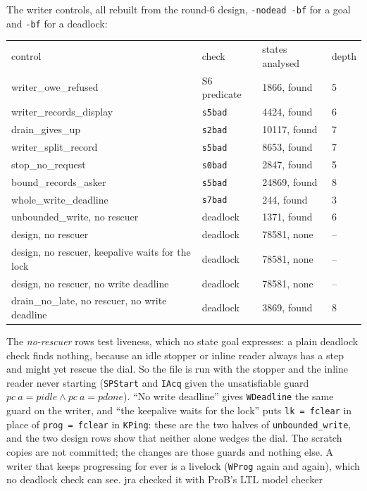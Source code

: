 \documentclass[a4paper,10pt,fleqn]{article}
\begin{document}
The writer controls, all rebuilt from the round-6 design, \texttt{-nodead -bf}
for a goal and \texttt{-bf} for a deadlock:
\begin{center}
\begin{tabular}{llll}
control & check & states analysed & depth \\
writer\_owe\_refused & S6 predicate & 1866, found & 5 \\
writer\_records\_display & \texttt{s5bad} & 4424, found & 6 \\
drain\_gives\_up & \texttt{s2bad} & 10117, found & 7 \\
writer\_split\_record & \texttt{s5bad} & 8653, found & 7 \\
stop\_no\_request & \texttt{s0bad} & 2847, found & 5 \\
bound\_records\_asker & \texttt{s5bad} & 24869, found & 8 \\
whole\_write\_deadline & \texttt{s7bad} & 244, found & 3 \\
unbounded\_write, no rescuer & deadlock & 1371, found & 6 \\
design, no rescuer & deadlock & 78581, none & -- \\
design, no rescuer, keepalive waits for the lock & deadlock & 78581, none & -- \\
design, no rescuer, no write deadline & deadlock & 78581, none & -- \\
drain\_no\_late, no rescuer, no write deadline & deadlock & 3869, found & 8 \\
\end{tabular}
\end{center}
The \emph{no-rescuer} rows test liveness, which no state goal expresses: a plain
deadlock check finds nothing, because an idle stopper or inline reader always has
a step and might yet rescue the dial.  So the file is run with the stopper and
the inline reader never starting (\texttt{SPStart} and \texttt{IAcq} given the
unsatisfiable guard $pc~a = pidle \land pc~a = pdone$).  ``No write deadline''
gives \texttt{WDeadline} the same guard on the writer, and ``the keepalive waits
for the lock'' puts \texttt{lk = fclear} in place of \texttt{prog = fclear} in
\texttt{KPing}: these are the two halves of \texttt{unbounded\_write}, and the
two design rows show that neither alone wedges the dial.  The scratch copies are
not committed; the changes are those guards and nothing else.  A writer that
keeps progressing for ever is a livelock (\texttt{WProg} again and again), which
no deadlock check can see.  jra checked it with ProB's LTL model checker
\end{document}
